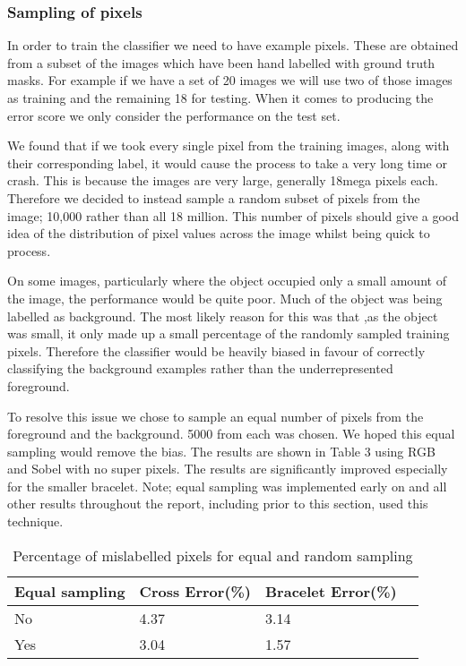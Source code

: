 \documentclass[12pt]{IIBproject}
\begin{document}
\subsubsection{Sampling of pixels}
In order to train the classifier we need to have example pixels. These are obtained from a subset of the images which have been hand labelled with ground truth masks. For example if we have a set of 20 images we will use two of those images as training and the remaining 18 for testing. When it comes to producing the error score we only consider the performance on the test set. 

We found that if we took every single pixel from the training images, along with their corresponding label, it would cause the process to take a very long time or crash. This is because the images are very large, generally 18mega pixels each. Therefore we decided to instead sample a random subset of pixels from the image; 10,000 rather than all 18 million. This number of pixels should give a good idea of the distribution of pixel values across the image whilst being quick to process. 

On some images, particularly where the object occupied only a small amount of the image, the performance would be quite poor. Much of the object was being labelled as background. The most likely reason for this was that ,as the object was small, it only made up a small percentage of the randomly sampled training pixels. Therefore the classifier would be heavily biased in favour of correctly classifying the background examples rather than the underrepresented foreground.

 To resolve this issue we chose to sample an equal number of pixels from the foreground and the background. 5000 from each was chosen. We hoped this equal sampling would remove the bias. The results are shown in Table 3 using RGB and Sobel with no super pixels. The results are significantly improved especially for the smaller bracelet. Note; equal sampling  was implemented early on and all other results throughout the report, including prior to this section, used this technique.
 \begin{table}[H]
 \begin{center}
    \begin{tabular}{ | l | l | l | p{5cm} |}
    \hline
    Equal sampling & Cross Error(\%) & Bracelet Error(\%) \\ \hline
    No & 4.37 & 3.14 \\ \hline
    Yes & 3.04 & 1.57 \\
    \hline
    
    \end{tabular}
    \caption{Percentage of mislabelled pixels for equal and random sampling}\label{table:somename}
\end{center}
\end{table}
 
\end{document}
